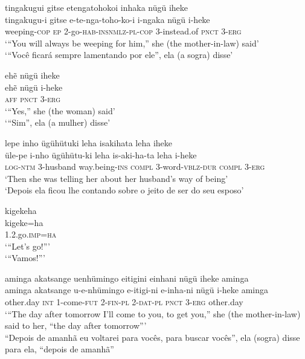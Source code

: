 \documentclass[output=paper,
modfonts,nonflat
]{langsci/langscibook}
\begin{document}
\ea tingakugui gitse etengatohokoi inhaka nügü iheke\\[.3em]
\gll tingakugu-i	gitse	e-te-nga-toho-ko-i		i-ngaka	nügü	i-heke \\
weeping-\textsc{cop}	\textsc{ep}	2-go-\textsc{hab-insnmlz}-\textsc{pl-cop}	3-instead.of	\textsc{pnct}	3-\textsc{erg} \\
\glt ‘“You will always be weeping for him,” she (the mother-in-law) said’\\
‘“Você ficará sempre lamentando por ele”, ela (a sogra) disse’\\
\z

\ea ehẽ nügü iheke\\[.3em]
\gll ehẽ	nügü	i-heke\\
\textsc{aff}	\textsc{pnct}	3-\textsc{erg}\\
\glt ‘“Yes,” she (the woman) said’\\
‘“Sim”, ela (a mulher) disse’\\
\z

\largerpage[2]
\ea lepe inho ügühütuki leha isakihata leha iheke\\[.3em]
\gll üle-pe		i-nho		ügühütu-ki	leha	is-aki-ha-ta		leha	i-heke\\
\textsc{log}-\textsc{ntm}	3-husband 	way.being-\textsc{ins}	\textsc{compl}	3-word-\textsc{vblz}-\textsc{dur}	\textsc{compl}	3-\textsc{erg}\\
\glt ‘Then she was telling her about her husband's  way of being’\\
‘Depois ela ficou lhe contando sobre o jeito de ser do seu esposo’ 
\z

\newpage 

\ea kigekeha\\[.3em]
\gll kigeke=ha\\
1.2.go.\textsc{imp}=\textsc{ha}\\
\glt ‘“Let’s go!”’\\
‘“Vamos!”’
\z


\ea aminga akatsange uenhümingo eitigini einhani nügü iheke aminga \\[.3em]
\gll aminga	akatsange	u-e-nhümingo	e-itigi-ni	e-inha-ni	nügü  i-heke aminga\\
other.day	\textsc{int}		1-come-\textsc{fut}	2-\textsc{fin}-\textsc{pl}		2-\textsc{dat}-\textsc{pl}	\textsc{pnct}	3-\textsc{erg} other.day \\
\glt ‘“The day after tomorrow I’ll come to you, to get you,” she (the mother-in-law) said to her, “the day after tomorrow”’\\
“Depois de amanhã eu voltarei para vocês, para buscar vocês”, ela (sogra) disse para ela, “depois de amanhã”\\
\z
\end{document}
